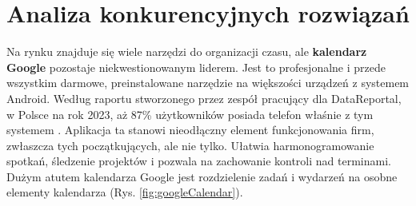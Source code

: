 \section{Analiza konkurencyjnych rozwiązań}

\phantom{Th}

Na rynku znajduje się wiele narzędzi do organizacji czasu, ale \textbf{kalendarz Google} pozostaje niekwestionowanym liderem.
Jest to profesjonalne i przede wszystkim darmowe, preinstalowane narzędzie na większości urządzeń z systemem Android.
Według raportu stworzonego przez zespół pracujący dla DataReportal, w Polsce na rok 2023, aż 87\% użytkowników posiada
telefon właśnie z tym systemem
\cite{datareportal}. Aplikacja ta stanowi nieodłączny element funkcjonowania firm, zwłaszcza tych początkujących,
ale nie tylko. Ułatwia harmonogramowanie spotkań, śledzenie projektów i pozwala na zachowanie kontroli nad terminami.
Dużym atutem kalendarza Google jest rozdzielenie zadań i wydarzeń na osobne elementy kalendarza (Rys. \ref{fig:googleCalendar}).\\

